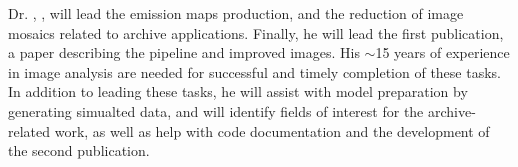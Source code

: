 %
Dr. , , will lead the emission maps production, and the reduction of image mosaics related to archive applications. Finally, he will lead the first publication, a paper describing the pipeline and improved images.  His $\sim$15 years of experience in image analysis are needed for successful and timely completion of these tasks. In addition to leading these tasks, he will assist with model preparation by generating simualted data, and will identify fields of interest for the archive-related work, as well as help with code documentation and the development of the second publication. \par
